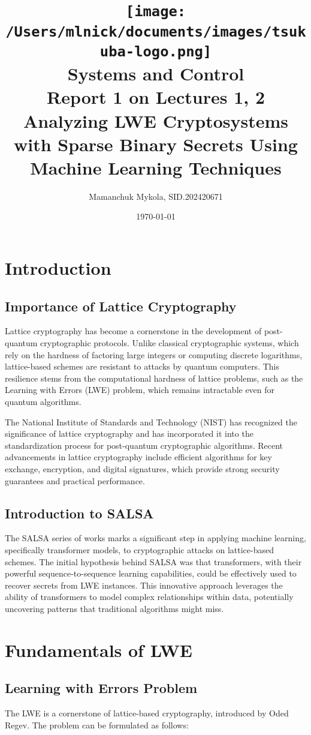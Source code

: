 \documentclass[12pt,a4paper]{article}
\title{
    \texttt{[image: /Users/mlnick/documents/images/tsukuba-logo.png]} \\
    \textbf{Systems and Control} \\
    \vspace{3mm}    
    Report 1 on Lectures 1, 2 \\
    Analyzing LWE Cryptosystems with Sparse Binary Secrets Using Machine Learning Techniques
}
\author{Mamanchuk Mykola, SID.202420671}
\date{\today}
\begin{document}
\maketitle


\section{Introduction}
\subsection{Importance of Lattice Cryptography}
Lattice cryptography has become a cornerstone in the development of post-quantum cryptographic protocols. Unlike classical cryptographic systems, which rely on the hardness of factoring large integers or computing discrete logarithms, lattice-based schemes are resistant to attacks by quantum computers. This resilience stems from the computational hardness of lattice problems, such as the Learning with Errors (LWE) problem, which remains intractable even for quantum algorithms.

The National Institute of Standards and Technology (NIST) has recognized the significance of lattice cryptography and has incorporated it into the standardization process for post-quantum cryptographic algorithms. Recent advancements in lattice cryptography include efficient algorithms for key exchange, encryption, and digital signatures, which provide strong security guarantees and practical performance.

\subsection{Introduction to SALSA}
The SALSA series of works marks a significant step in applying machine learning, specifically transformer models, to cryptographic attacks on lattice-based schemes. The initial hypothesis behind SALSA was that transformers, with their powerful sequence-to-sequence learning capabilities, could be effectively used to recover secrets from LWE instances. This innovative approach leverages the ability of transformers to model complex relationships within data, potentially uncovering patterns that traditional algorithms might miss.

\section{Fundamentals of LWE}
\subsection{Learning with Errors Problem}
The LWE is a cornerstone of lattice-based cryptography, introduced by Oded Regev. The problem can be formulated as follows:
\end{document}

